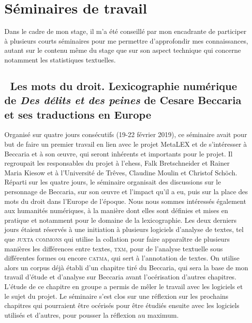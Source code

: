 \chapter{Séminaires de travail}
Dans le cadre de mon stage, il m'a été conseillé par mon encadrante de participer à plusieurs courts séminaires pour me permettre d'approfondir mes connaissances, autant sur le contenu même du stage que sur son aspect technique qui concerne notamment les statistiques textuelles.

\section{\og~Les mots du droit. Lexicographie numérique de \emph{Des délits et des peines} de Cesare Beccaria et ses traductions en Europe~\fg{}}
Organisé sur quatre jours consécutifs (19-22 février 2019), ce séminaire avait pour but de faire un premier travail en lien avec le projet MetaLEX et de s'intéresser à Beccaria et à son œuvre, qui seront inhérents et importants pour le projet. Il regroupait les responsables du projet à l'\acrshort{ehess}, Falk Bretschneider et Rainer Maria Kiesow et à l'Université de Trêves, Claudine Moulin et Christof Schöch.
Réparti sur les quatre jours, le séminaire organisait des discussions sur le personnage de Beccaria, sur son œuvre et l'impact qu'il a eu, puis sur la place des mots du droit dans l'Europe de l'époque. Nous nous sommes intéressés également aux humanités numériques, à la manière dont elles sont définies et mises en pratique et notamment pour le domaine de la lexicographie. Les deux derniers jours étaient réservés à une initiation à plusieurs logiciels d'analyse de textes, tel que \textsc{juxta commons} qui utilise la collation pour faire apparaître de plusieurs manières les différences entre textes, \textsc{txm}, pour de l'analyse textuelle sous différentes formes ou encore \textsc{catma}, qui sert à l'annotation de textes. On utilise alors un corpus déjà établi d'un chapitre tiré du Beccaria, qui sera la base de mon travail d'étude et d'analyse sur Beccaria avant l'océrisation d'autres chapitres. L'étude de ce chapitre en groupe a permis de mêler le travail avec les logiciels et le sujet du projet.
Le séminaire s'est clos sur une réflexion sur les prochains chapitres qui pourraient être océrisés pour être étudiés ensuite avec les logiciels utilisés et d'autres, pour pousser la réflexion au maximum.

